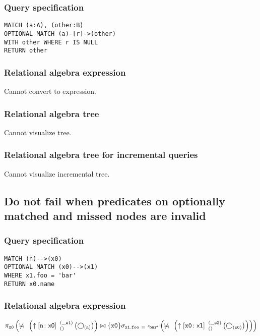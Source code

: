 \subsubsection*{Query specification}

\begin{lstlisting}
MATCH (a:A), (other:B)
OPTIONAL MATCH (a)-[r]->(other)
WITH other WHERE r IS NULL
RETURN other
\end{lstlisting}

\subsubsection*{Relational algebra expression}

Cannot convert to expression.

\subsubsection*{Relational algebra tree}

Cannot visualize tree.

\subsubsection*{Relational algebra tree for incremental queries}

Cannot visualize incremental tree.

\subsection{Do not fail when predicates on optionally matched and missed nodes are invalid}

\subsubsection*{Query specification}

\begin{lstlisting}
MATCH (n)-->(x0)
OPTIONAL MATCH (x0)-->(x1)
WHERE x1.foo = 'bar'
RETURN x0.name
\end{lstlisting}

\subsubsection*{Relational algebra expression}

$\projection{\var{x0}} \left(\alldifferent{} \left(\expandout{n}{x0}{}{\_e1}{} \left(\getvertices{n}{}\right)\right) \join \{\var{x0}\} \selection{\mathtt{x1.foo~=~'bar'}} \left(\alldifferent{} \left(\expandout{x0}{x1}{}{\_e2}{} \left(\getvertices{x0}{}\right)\right)\right)\right)$

